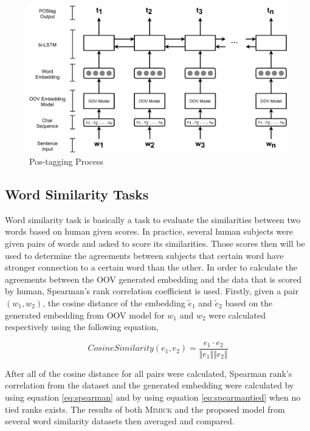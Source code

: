         \begin{figure}
            \centering
            \includegraphics[width=.8\linewidth]{images/postag.pdf}
            \caption{Pos-tagging Process}
            \label{fig:postag}
        \end{figure}
 
    \subsection{Word Similarity Tasks}
        Word similarity task is basically a task to evaluate the
        similarities between two words based on human given scores. In
        practice, several human subjects were given pairs of words and
        asked to score its similarities. Those scores then will be
        used to determine the agreements between subjects that certain
        word have stronger connection to a certain word than the
        other. In order to calculate the agreements between the OOV
        generated embedding and the data that is scored by human,
        Spearman's rank correlation coefficient is used. Firstly,
        given a pair $(w_1, w_2)$, the cosine distance of the
        embedding $\tilde{e}_1$ and $\tilde{e}_2$ based on the
        generated embedding from OOV model for $w_1$ and $w_2$ were
        calculated respectively using the following equation,

        \begin{equation}
            \label{eq:cosinesim}
            CosineSimilarity(e_1, e_2) = \frac{e_1 \cdot e_2}{\Vert e_1 \Vert \Vert e_2 \Vert}
        \end{equation}

        After all of the cosine distance for all pairs were calculated,
        Spearman rank's correlation from the dataset and the generated
        embedding were calculated by using equation \ref{eq:spearman}
        and by using equation \ref{eq:spearmantied} when no tied ranks
        exists. The results of both \textsc{Mimick} and the proposed
        model from several word similarity datasets then averaged and
        compared.
        
